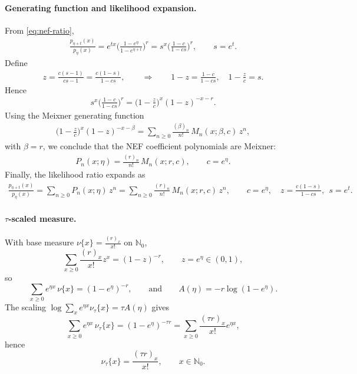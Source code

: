 \documentclass[a4paper,11pt]{article}
\numberwithin{equation}{section}
\theoremstyle{plain}
\theoremstyle{definition}
\theoremstyle{remark}
\newcommand{\1}{\ensuremath{\mathds{1}}\xspace}
\begin{document}
\paragraph{Generating function and likelihood expansion.} From \eqref{eq:nef-ratio},
\begin{align}
\frac{p_{\eta+t}(x)}{p_\eta(x)}
=e^{t x}\Big(\frac{1-e^\eta}{1-e^{\eta+t}}\Big)^r
=s^x\Big(\frac{1-c}{1-cs}\Big)^r,\qquad s=e^t.
\end{align}
Define
\begin{align}
z=\frac{c(s-1)}{cs-1}=\frac{c(1-s)}{1-cs},
\qquad\Longrightarrow\qquad
1-z=\frac{1-c}{1-cs},\quad 1-\frac{z}{c}=s.
\end{align}
Hence
\begin{align}
s^x\Big(\frac{1-c}{1-cs}\Big)^r
=\Big(1-\frac{z}{c}\Big)^x(1-z)^{-x-r}.
\end{align}
Using the Meixner generating function
\begin{align}
\Big(1-\frac{z}{c}\Big)^x(1-z)^{-x-\beta}
=\sum_{n\ge 0}\frac{(\beta)_n}{n!}\,M_n(x;\beta,c)\,z^n,
\end{align}
with $\beta=r$, we conclude that the NEF coefficient polynomials are Meixner:
\begin{align}
P_n(x;\eta)=\frac{(r)_n}{n!}\,M_n(x;r,c),\qquad c=e^\eta.
\end{align}
Finally, the likelihood ratio expands as
\begin{align}
\frac{p_{\eta+t}(x)}{p_\eta(x)}
=\sum_{n\ge 0}P_n(x;\eta)\,z^n
=\sum_{n\ge 0}\frac{(r)_n}{n!}\,M_n(x;r,c)\,z^n,
\qquad c=e^\eta,\quad z=\frac{c(1-s)}{1-cs},\ \ s=e^t.
\end{align}
\paragraph{$\tau$-scaled measure.}
With base measure $\nu\{x\}=\frac{(r)_x}{x!}$ on $\mathbb{N}_0$,
\[
\sum_{x\ge 0} \frac{(r)_x}{x!}z^x=(1-z)^{-r},
\qquad z=e^\eta\in(0,1),
\]
so
\[
\sum_{x\ge 0} e^{\eta x}\,\nu\{x\}=(1-e^\eta)^{-r},
\qquad\text{and}\qquad
A(\eta)=-r\log(1-e^\eta).
\]
The scaling $\log\sum_x e^{\eta x}\nu_\tau\{x\}=\tau A(\eta)$ gives
\[
\sum_{x\ge 0} e^{\eta x}\,\nu_\tau\{x\}=(1-e^\eta)^{-\tau r}
=\sum_{x\ge 0}\frac{(\tau r)_x}{x!}e^{\eta x},
\]
hence
\[
\nu_\tau\{x\}=\frac{(\tau r)_x}{x!},\qquad x\in\mathbb{N}_0.
\]
\end{document}

